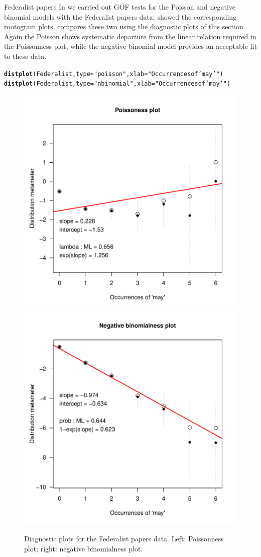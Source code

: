 \documentclass[11pt]{book}\usepackage[]{graphicx}\usepackage[]{color}
\makeatletter
\newcommand{\hlstr}[1]{\textcolor[rgb]{0.192,0.494,0.8}{#1}}%
\newcommand{\hlstd}[1]{\textcolor[rgb]{0.345,0.345,0.345}{#1}}%
\newcommand{\hlkwc}[1]{\textcolor[rgb]{0.333,0.667,0.333}{#1}}%
\newcommand{\hlkwd}[1]{\textcolor[rgb]{0.737,0.353,0.396}{\textbf{#1}}}%
\newenvironment{kframe}{%
 \def\at@end@of@kframe{}%
 \ifinner\ifhmode%
  \def\at@end@of@kframe{\end{minipage}}%
  \begin{minipage}{\columnwidth}%
 \fi\fi%
 \def\FrameCommand##1{\hskip\@totalleftmargin \hskip-\fboxsep
 \colorbox{shadecolor}{##1}\hskip-\fboxsep
     \hskip-\linewidth \hskip-\@totalleftmargin \hskip\columnwidth}%
 \MakeFramed {\advance\hsize-\width
   \@totalleftmargin\z@ \linewidth\hsize
   \@setminipage}}%
 {\par\unskip\endMakeFramed%
 \at@end@of@kframe}
\newenvironment{knitrout}{}{} %
\renewenvironment{knitrout}{\small\renewcommand{\baselinestretch}{.85}}{} %
\makeatother
\begin{document}
\begin{Example}{Federalist papers}
In  we carried out GOF tests for the Poisson and
negative binomial models with the Federalist papers data;
 showed the corresponding rootogram plots.
 compares these two using the diagnostic plots of
this section. Again the Poisson shows systematic departure from the 
linear relation required in the Poissonness plot, while the
negative binomial model provides an acceptable fit to
these data.
\begin{knitrout}
\color{fgcolor}\begin{kframe}
\begin{alltt}
\hlkwd{distplot}\hlstd{(Federalist,} \hlkwc{type} \hlstd{=} \hlstr{"poisson"}\hlstd{,} \hlkwc{xlab}\hlstd{=}\hlstr{"Occurrences of 'may'"}\hlstd{)}
\hlkwd{distplot}\hlstd{(Federalist,} \hlkwc{type} \hlstd{=} \hlstr{"nbinomial"}\hlstd{,} \hlkwc{xlab}\hlstd{=}\hlstr{"Occurrences of 'may'"}\hlstd{)}
\end{alltt}
\end{kframe}\begin{figure}[htbp]


\centerline{\includegraphics[width=.49\textwidth]{ch03/fig/distplot51} 
\includegraphics[width=.49\textwidth]{ch03/fig/distplot52} }

\caption[Diagnostic plots for the Federalist papers data]{Diagnostic plots for the Federalist papers data. Left: Poissonness plot; right: negative binomialness plot.\label{fig:distplot5}}
\end{figure}


\end{knitrout}

\end{Example}
\end{document}
